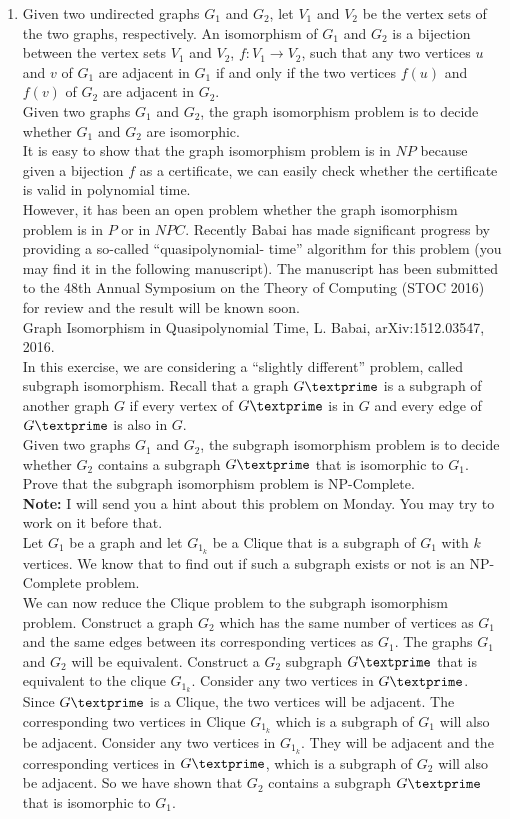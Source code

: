 \documentclass[paper=a4, fontsize=11pt]{scrartcl} %
\numberwithin{equation}{section} %
\numberwithin{figure}{section} %
\numberwithin{table}{section} %
\begin{document}
\begin{enumerate}
\item Given two undirected graphs $G_1$ and $G_2$, let $V_1$ and $V_2$ be the vertex sets of the two graphs, respectively. An isomorphism of $G_1$ and $G_2$ is a bijection between the vertex sets $V_1$ and $V_2$, $f : V_1 \rightarrow V_2$, such that any two vertices $u$ and $v$ of $G_1$ are adjacent in $G_1$ if and only if the two vertices $f(u)$ and $f(v)$ of $G_2$ are adjacent in $G_2$.\\
Given two graphs $G_1$ and $G_2$, the graph isomorphism problem is to decide whether $G_1$ and $G_2$ are isomorphic.\\
It is easy to show that the graph isomorphism problem is in $NP$ because given a bijection $f$ as a certificate, we can easily check whether the certificate is valid in polynomial time.\\
However, it has been an open problem whether the graph isomorphism problem is in $P$ or in $NPC$. Recently Babai has made significant progress by providing a so-called \enquote{quasipolynomial- time} algorithm for this problem (you may find it in the following manuscript). The manuscript has been submitted to the 48th Annual Symposium on the Theory of Computing (STOC 2016) for review and the result will be known soon.\\
Graph Isomorphism in Quasipolynomial Time, L. Babai, arXiv:1512.03547, 2016.\\
In this exercise, we are considering a \enquote{slightly different} problem, called subgraph isomorphism. Recall that a graph $G\textprime$ is a subgraph of another graph $G$ if every vertex of $G\textprime$ is in $G$ and every edge of $G\textprime$ is also in $G$.\\
Given two graphs $G_1$ and $G_2$, the subgraph isomorphism problem is to decide whether $G_2$ contains a subgraph $G\textprime$ that is isomorphic to $G_1$.\\
Prove that the subgraph isomorphism problem is NP-Complete.\\
\textbf{Note:} I will send you a hint about this problem on Monday. You may try to work on it before that.\\

Let $G_1$ be a graph and let $G_{1_k}$ be a Clique that is a subgraph of $G_1$ with $k$ vertices. We know that to find out if such a subgraph exists or not is an NP-Complete problem.\\

We can now reduce the Clique problem to the subgraph isomorphism problem. Construct a graph $G_2$ which has the same number of vertices as $G_1$ and the same edges between its corresponding vertices as $G_1$. The graphs $G_1$ and $G_2$ will be equivalent. Construct a $G_2$ subgraph $G\textprime$ that is equivalent to the clique $G_{1_k}$. Consider any two vertices in  $G\textprime$. Since $G\textprime$ is a Clique, the two vertices will be adjacent. The corresponding two vertices in Clique $G_{1_k}$ which is a subgraph of $G_1$ will also be adjacent. Consider any two vertices in $G_{1_k}$. They will be adjacent and the corresponding vertices in $G\textprime$, which is a subgraph of $G_2$ will also be adjacent. So we have shown that $G_2$ contains a subgraph $G\textprime$ that is isomorphic to $G_1$.


\end{enumerate}
\end{document}

